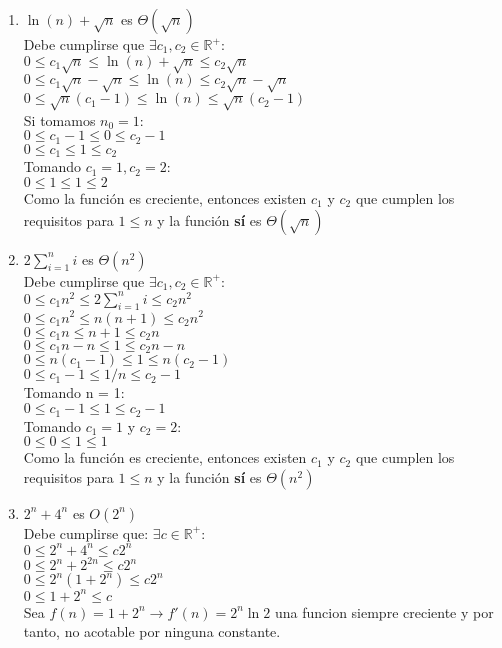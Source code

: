 \documentclass[10pt]{article}
\begin{document}
\begin{enumerate}
\begin{enumerate}
  \item $\ln(n)+\sqrt{n}$ es $\Theta(\sqrt{n})$\\
  Debe cumplirse que $\exists c_1,c_2\in\mathbb{R^+}:$\\$0\leq c_1\sqrt{n}\leq \ln(n)+\sqrt{n}\leq c_2\sqrt{n}$\\
  $0\leq c_1\sqrt{n}-\sqrt{n}\leq \ln(n)\leq c_2\sqrt{n}-\sqrt{n}$\\
  $0\leq \sqrt{n}(c_1-1)\leq \ln(n)\leq \sqrt{n}(c_2-1)$\\Si tomamos $n_0=1$:\\
  $0\leq c_1-1\leq 0\leq c_2-1$\\$0\leq c_1\leq 1\leq c_2$\\Tomando $c_1=1,c_2=2$:\\
  $0\leq 1\leq 1\leq 2$\\
  Como la función es creciente, entonces existen $c_1$ y $c_2$ que cumplen los
  requisitos para $1 \leq n$  y la función \textbf{sí} es $\Theta(\sqrt{n})$\\
  \item $2\sum_{i=1}^n i$ es $\Theta(n^2)$\\Debe cumplirse que $\exists c_1,c_2\in\mathbb{R^+}:$\\$0\leq c_1n^2\leq 2\sum_{i=1}^n i\leq c_2n^2$\\
  $0\leq c_1n^2\leq n(n+1)\leq c_2n^2$\\$0\leq c_1n\leq n+1\leq c_2n$\\
  $0\leq c_1n-n\leq 1\leq c_2n-n$\\$0\leq n(c_1-1)\leq 1\leq n(c_2-1)$\\
  $0\leq c_1-1\leq 1/n\leq c_2-1$\\Tomando n = 1:\\$0\leq c_1-1\leq 1\leq c_2-1$\\
  Tomando $c_1=1$ y $c_2=2$:\\$0\leq 0 \leq 1 \leq 1$\\
  Como la función es creciente, entonces existen $c_1$ y $c_2$ que cumplen los requisitos para $1 \leq n$  y la función \textbf{sí} es $\Theta(n^2)$\\
  \item $2^n+4^n$ es $O(2^n)$\\Debe cumplirse que: $\exists c\in\mathbb{R^+}$:\\
  $0\leq 2^n+4^n\leq c2^n$\\$0\leq 2^n+2^{2n}\leq c2^n$\\$0\leq 2^n(1+2^n)\leq c2^n$\\$0\leq 1+2^n\leq c$\\Sea $f(n)=1+2^n\rightarrow f'(n)=2^n \ln 2$ una funcion siempre creciente y por tanto, no acotable por ninguna constante.\\

\end{enumerate}
\end{enumerate}
\end{document}
